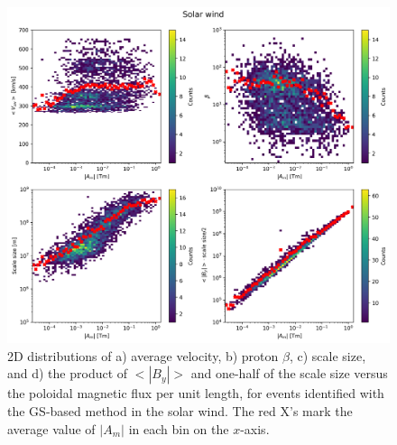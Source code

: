 \begin{figure}[ht!]
    \centering
    \includegraphics[width=\textwidth]{Figures/GS analysis/heatmap_solarwind.png}
    \caption[2D distributions of various parameters vs. $|A_m|$ in the solar wind]{2D distributions of a) average velocity, b) proton $\beta$, c) scale size, and d) the product of $<|B_y|>$ and one-half of the scale size versus the poloidal magnetic flux per unit length, for events identified with the GS-based method in the solar wind. The red X's mark the average value of $|A_m|$ in each bin on the $x$-axis.}
    \label{fig:heatmap-solarwind}
\end{figure}

